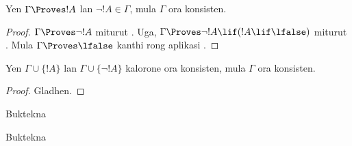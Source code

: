 \documentclass[../../../include/open-logic-section]{subfiles}
\begin{document}
\begin{prop}
  Yen $\Gamma \Proves !A$ lan $\lnot !A \in \Gamma$, mula $\Gamma$
  ora konsisten.
\end{prop}

\begin{proof}
  $\Gamma \Proves \lnot !A$ miturut .
  Uga, $\Gamma \Proves \lnot !A \lif (!A \lif \lfalse)$ miturut
  . Mula $\Gamma \Proves \lfalse$ kanthi rong
  aplikasi .
\end{proof}


\begin{prop}
  Yen $\Gamma \cup \{!A\}$ lan $\Gamma \cup \{\lnot !A\}$ kalorone
  ora konsisten, mula $\Gamma$ ora konsisten.
\end{prop}

\begin{proof}
Gladhen.
\end{proof}

\begin{prob}
  Buktekna 
\end{prob}
\tagendprob

\begin{prob}
  Buktekna 
\end{prob}
\tagendprob
\end{document}
